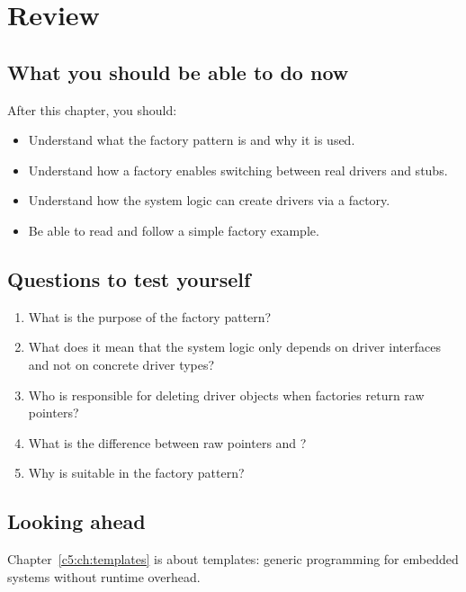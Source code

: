 
\section{Review}
\label{c4:sec:review}

\subsection*{What you should be able to do now}
After this chapter, you should:
\begin{itemize}
  \item Understand what the factory pattern is and why it is used.
  \item Understand how a factory enables switching between real drivers and stubs.
  \item Understand how the system logic can create drivers via a factory.
  \item Be able to read and follow a simple factory example.
\end{itemize}

\subsection*{Questions to test yourself}
\begin{enumerate}
  \item What is the purpose of the factory pattern?
  \item What does it mean that the system logic only depends on driver interfaces and not on
    concrete driver types?
  \item Who is responsible for deleting driver objects when factories return raw pointers?
  \item What is the difference between raw pointers and ?
  \item Why is  suitable in the factory pattern?
\end{enumerate}

\subsection*{Looking ahead}
Chapter~\ref{c5:ch:templates} is about templates: generic programming for embedded systems without
runtime overhead.
